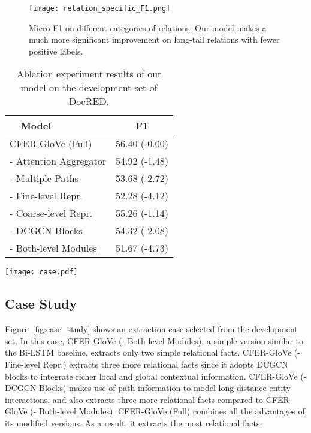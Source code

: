 \documentclass[letterpaper]{article} \usepackage{aaai21}  \usepackage{times}  \usepackage{helvet} \usepackage{courier}  \usepackage[hyphens]{url}  \usepackage{graphicx} \urlstyle{rm} \def\UrlFont{\rm}  \usepackage{natbib}  \usepackage{caption} \frenchspacing  \setlength{\pdfpagewidth}{8.5in}  \setlength{\pdfpageheight}{11in}
\begin{document}
\begin{figure}[t]
\centering
\texttt{[image: relation\_specific\_F1.png]}
\caption{
Micro F1 on different categories of relations. 
Our model makes a much more significant improvement on long-tail relations with fewer positive labels. 
}
\label{fig:relation_f1}
\end{figure}

\begin{table}[t]
\centering
\setlength{\tabcolsep}{10pt}
\begin{tabular}{l | c}
\toprule
\textbf{~~Model} & \textbf{F1}\\
\midrule
\midrule
CFER-GloVe (Full) & 56.40 (-0.00) \\
\midrule
- Attention Aggregator & 54.92 (-1.48) \\
- Multiple Paths & 53.68 (-2.72) \\
- Fine-level Repr. & 52.28 (-4.12) \\
\midrule
- Coarse-level Repr. & 55.26 (-1.14) \\
- DCGCN Blocks & 54.32 (-2.08) \\
\midrule
- Both-level Modules & 51.67 (-4.73) \\
\bottomrule
\end{tabular}
\caption{Ablation experiment results of our model on the development set of DocRED. }
\label{tab:ablation_rlt}
\end{table}

\begin{figure*}[t]
\centering
\texttt{[image: case.pdf]}
\caption{
An extraction case from the development set. 
We show the relational facts extracted by four versions of CFER-GloVe. 
For CFER-GloVe (Full) and CFER-GloVe (- DCGCN Blocks), we additionally show the paths along with their attention weights used for producing fine-level representations of entity 0 (Daniel Ajayi Adeniran) and entity 5 (Redeemed Christian Church). 
}
\label{fig:case_study}
\end{figure*}

\subsection{Case Study}
Figure~\ref{fig:case_study} shows an extraction case selected from the development set. 
In this case, CFER-GloVe (- Both-level Modules), a simple version similar to the Bi-LSTM baseline, extracts only two simple relational facts. 
CFER-GloVe (- Fine-level Repr.) extracts three more relational facts since it adopts DCGCN blocks to integrate richer local and global contextual information. 
CFER-GloVe (- DCGCN Blocks) makes use of path information to model long-distance entity interactions, and also extracts three more relational facts compared to CFER-GloVe (- Both-level Modules). 
CFER-GloVe (Full) combines all the advantages of its modified versions. 
As a result, it extracts the most relational facts. 
\end{document}
